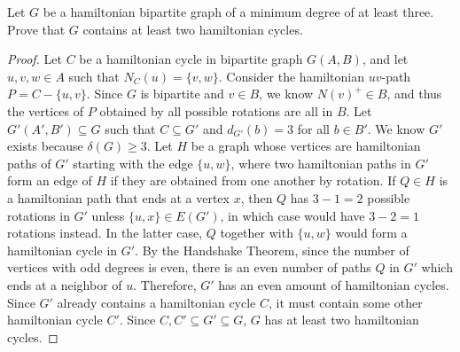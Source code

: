 \documentclass{article}
\newenvironment{problem}[2][Question]{\begin{trivlist}
\item[\hskip \labelsep {\bfseries #1}\hskip \labelsep {\bfseries #2.}]}{\end{trivlist}}
\begin{document}
\begin{problem}{2.5.11}
    Let $G$ be a hamiltonian bipartite graph of a minimum degree of at least three. Prove that $G$ contains at least two hamiltonian cycles.
\end{problem}
\begin{proof}
    Let $C$ be a hamiltonian cycle in bipartite graph $G(A,B)$, and let $u, v, w \in A$ such that $N_C(u) = \{v, w\}$. Consider the hamiltonian $uv$-path $P = C - \{u, v\}$. Since $G$ is bipartite and $v \in B$, we know $N(v)^+ \in B$, and thus the vertices of $P$ obtained by all possible rotations are all in $B$. Let $G'(A', B') \subseteq G$ such that $C \subseteq G'$ and $d_{G'}(b) = 3$ for all $b \in B'$. We know $G'$ exists because $\delta(G) \geq 3$. Let $H$ be a graph whose vertices are hamiltonian paths of $G'$ starting with the edge $\{u, w\}$, where two hamiltonian paths in $G'$ form an edge of $H$ if they are obtained from one another by rotation. If $Q \in H$ is a hamiltonian path that ends at a vertex $x$, then $Q$ has $3 - 1 = 2$ possible rotations in $G'$ unless $\{u, x\} \in E(G')$, in which case would have $3 - 2 = 1$ rotations instead. In the latter case, $Q$ together with $\{u, w\}$ would form a hamiltonian cycle in $G'$. By the Handshake Theorem, since the number of vertices with odd degrees is even, there is an even number of paths $Q$ in $G'$ which ends at a neighbor of $u$. Therefore, $G'$ has an even amount of hamiltonian cycles. Since $G'$ already contains a hamiltonian cycle $C$, it must contain some other hamiltonian cycle $C'$. Since $C, C' \subseteq G' \subseteq G$, $G$ has at least two hamiltonian cycles.
\end{proof}

\newpage
\end{document}
